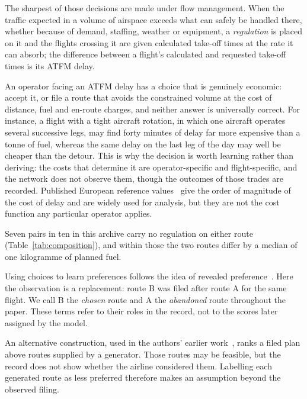\documentclass[conference,10pt,a4paper,IEEEoverridecommandlockouts]{IEEEtran}
\begin{document}
The sharpest of those decisions are made under flow management. When the
traffic expected in a volume of airspace exceeds what can
safely be handled there, whether because of demand, staffing, weather or
equipment, a \emph{regulation} is placed on it and the flights crossing it are given calculated take-off times at
the rate it can absorb; the difference between a flight's calculated
and requested take-off times is its ATFM delay.

An
operator facing an ATFM delay has a choice that is genuinely
economic: accept it, or file a route that avoids the constrained
volume at the cost of distance, fuel and en-route charges, and neither
answer is universally correct. For instance, a flight with a tight
aircraft rotation, in which one aircraft operates several successive legs,
may find forty minutes of delay far more expensive than a
tonne of fuel, whereas the same delay on the last leg of the day may well be
cheaper than the detour. This is why the decision is worth learning rather
than deriving: the costs that determine it are operator-specific and
flight-specific, and the network does not observe them, though the
outcomes of those trades are recorded. Published European reference
values~\cite{cook2015} give the order of magnitude of the cost of delay
and are widely used for analysis, but they are not the cost function
any particular operator applies.

Seven pairs in ten in this archive carry no regulation on either route
(Table~\ref{tab:composition}), and within those the two routes differ by
a median of one kilogramme of planned fuel. 


Using choices to learn preferences follows the idea of revealed
preference~\cite{samuelson1938}. Here the observation is a replacement:
route B was filed after route A for the same flight. We call B the
\emph{chosen} route and A the \emph{abandoned} route throughout the
paper. These terms refer to their roles in the record, not to the scores
later assigned by the model.

An alternative construction, used in the authors' earlier
work~\cite{dalmau2024}, ranks a filed plan above routes supplied by a
generator. Those routes may be feasible, but the record does not show
whether the airline considered them. Labelling each generated route as
less preferred therefore makes an assumption beyond the observed filing.
\end{document}
